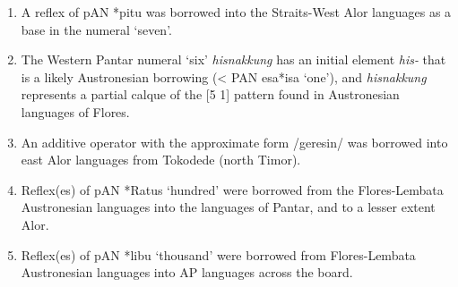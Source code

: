 \begin{enumerate}
\item A reflex of pAN *pitu was borrowed into the Straits-West Alor languages as a base in the numeral `seven'. 

\item The Western Pantar numeral `six' \textit{hisnakkung} has an initial element \textit{his-} that is a likely Austronesian borrowing ({\textless} PAN esa{\Tilde}*isa `one'), and \textit{hisnakkung} represents a partial calque of the [5 1] pattern found in Austronesian languages of Flores. 

\item An additive operator with the approximate form /geresin/ was borrowed into east Alor languages from Tokodede (north Timor). 

\item Reflex(es) of pAN *Ratus `hundred' were borrowed from the Flores-Lembata Austronesian languages into the languages of Pantar, and to a lesser extent Alor.

\item Reflex(es) of pAN *libu `thousand' were borrowed from Flores-Lembata Austronesian languages into AP languages across the board.  


\end{enumerate}
